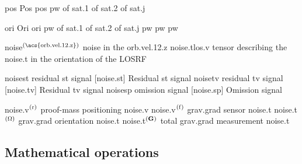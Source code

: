 \begin{acronym}[---------------]
						{pos}
						{Pos}
					{pos}
			{pw}
				{ of }			{sat.1}
				{ of }			{sat.2}
				{ of }			{sat.j}

						{ori}
						{Ori}
					{ori}
			{pw}
			{ of }			{sat.1}
			{ of }			{sat.2}
			{ of }			{sat.j}
	{pw}
	{pw}
	{pw}

							{\acs{noise}$^{\left(\mbox{\scriptsize{\acs{orb.vel.12.z}}}\right)}$}	{\acl{noise} in the \acl{orb.vel.12.z}}
							{\acs{noise.t}\acs{los.v}}	{tensor describing the \acl{noise.t} in the orientation of the \acs{LOSRF}}

				{\acs{noise}\acs{st}}		{residual \acl{st} signal}
				[\acs{noise.st}]				{Residual \acl{st} signal}
				{\acs{noise}\acs{tv}}		{residual \acl{tv} signal}
				[\acs{noise.tv}]				{Residual \acl{tv} signal}
				{\acs{noise}\acs{sp}}		{omission signal}
				[\acs{noise.sp}]				{Omission signal}

			{\acs{noise.v}$^{\rm\left(r\right)}$}
																												{proof-mass positioning \acl{noise.v}}
			{\acs{noise.v}$^{\rm\left(f\right)}$}
																												{\acl{grav.grad} sensor \acl{noise.t}}
			{\acs{noise.t}$^{\rm\left({\bm{\Omega}}\right)}$}
																												{\acl{grav.grad} orientation \acl{noise.t}}
			{\acs{noise.t}$^{\rm\left({\bf G}\right)}$}
																												{total \acl{grav.grad} measurement \acl{noise.t}}



\ifdefined\IncludeSymbolsText
\begin{changemargin}{\symbolsleftmarginfix}{\symbolsrightmarginfix}
\ifdefined\IncludeSymbolsSections
\section{Mathematical operations}
\label{sec:acro_math}
\else
{}\medskip
\fi
\end{changemargin}
\fi


\end{acronym}
